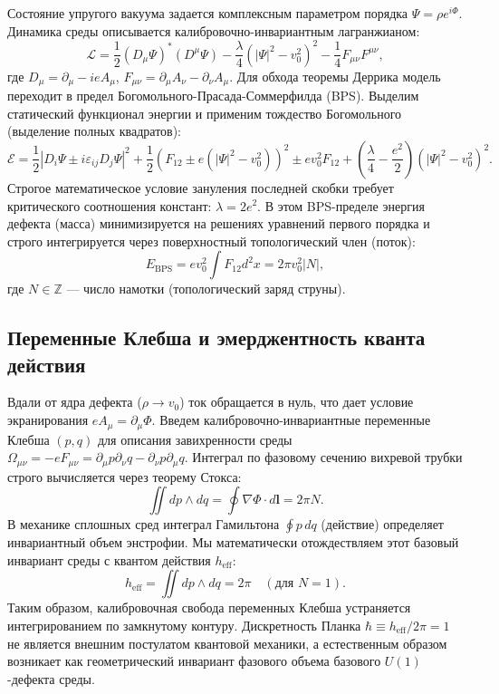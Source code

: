 \documentclass[12pt,a4paper]{article}
\begin{document}
Состояние упругого вакуума задается комплексным параметром порядка $\Psi = \rho e^{i\Phi}$. Динамика среды описывается калибровочно-инвариантным лагранжианом:
\begin{equation}
\mathcal{L} = \frac{1}{2} (D_\mu \Psi)^* (D^\mu \Psi) - \frac{\lambda}{4} (|\Psi|^2 - v_0^2)^2 - \frac{1}{4} F_{\mu\nu} F^{\mu\nu},
\label{eq:lagrangian}
\end{equation}
где $D_\mu = \partial_\mu - i e A_\mu$, $F_{\mu\nu} = \partial_\mu A_\nu - \partial_\nu A_\mu$. 
Для обхода теоремы Деррика модель переходит в предел Богомольного-Прасада-Соммерфилда (BPS). Выделим статический функционал энергии и применим тождество Богомольного (выделение полных квадратов):
\begin{equation}
\mathcal{E} = \frac{1}{2} |D_i \Psi \pm i \varepsilon_{ij} D_j \Psi|^2 + \frac{1}{2} \left(F_{12} \pm e(|\Psi|^2 - v_0^2)\right)^2 \pm e v_0^2 F_{12} + \left(\frac{\lambda}{4} - \frac{e^2}{2}\right) (|\Psi|^2 - v_0^2)^2.
\end{equation}
Строгое математическое условие зануления последней скобки требует критического соотношения констант: $\lambda = 2e^2$. В этом BPS-пределе энергия дефекта (масса) минимизируется на решениях уравнений первого порядка и строго интегрируется через поверхностный топологический член (поток):
\begin{equation}
E_{\text{BPS}} = e v_0^2 \int F_{12} d^2x = 2\pi v_0^2 |N|,
\end{equation}
где $N \in \mathbb{Z}$ — число намотки (топологический заряд струны).

\subsection{Переменные Клебша и эмерджентность кванта действия}
Вдали от ядра дефекта ($\rho \to v_0$) ток обращается в нуль, что дает условие экранирования $e A_\mu = \partial_\mu \Phi$. Введем калибровочно-инвариантные переменные Клебша $(p, q)$ для описания завихренности среды $\Omega_{\mu\nu} = -e F_{\mu\nu} = \partial_\mu p \partial_\nu q - \partial_\nu p \partial_\mu q$.
Интеграл по фазовому сечению вихревой трубки строго вычисляется через теорему Стокса:
\begin{equation}
\iint dp \wedge dq = \oint \nabla \Phi \cdot d\mathbf{l} = 2\pi N.
\end{equation}
В механике сплошных сред интеграл Гамильтона $\oint p \, dq$ (действие) определяет инвариантный объем энстрофии. Мы математически отождествляем этот базовый инвариант среды с квантом действия $h_{\text{eff}}$:
\begin{equation}
h_{\text{eff}} = \iint dp \wedge dq = 2\pi \quad (\text{для } N=1).
\end{equation}
Таким образом, калибровочная свобода переменных Клебша устраняется интегрированием по замкнутому контуру. Дискретность Планка $\hbar \equiv h_{\text{eff}}/2\pi = 1$ не является внешним постулатом квантовой механики, а естественным образом возникает как геометрический инвариант фазового объема базового $U(1)$-дефекта среды.
	
\end{document}
